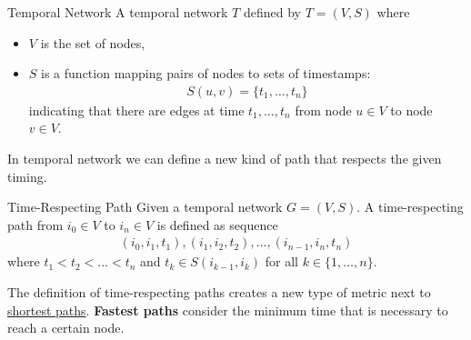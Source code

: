 \documentclass[english]{panikzettel}
\begin{document}
\begin{defi}{Temporal Network}
A temporal network $ T $ defined by $ T = (V,S) $ where
\begin{itemize}
	\item $ V $ is the set of nodes,
	\item $ S $ is a function mapping pairs of nodes to sets of timestamps:
\begin{align*}
	S(u,v) = \{t_1, \dots, t_n\}
\end{align*}
indicating that there are edges at time $ t_1, \dots, t_n $ from node $ u \in V $ to node $ v \in V $.
\end{itemize}
\end{defi}

In temporal network we can define a new kind of path that respects the given timing.

\begin{defi}{Time-Respecting Path}
Given a temporal network $ G = (V,S) $.
A time-respecting path from $ i_0 \in V $ to $ i_n \in V $ is defined as sequence
\begin{align*}
	(i_0,i_1,t_1), (i_1,i_2,t_2), \dots, (i_{n-1}, i_n,t_n)
\end{align*}
where $ t_1 < t_2 < \dots < t_n $ and $ t_k \in S(i_{k-1},i_k) $ for all $ k \in \{1, \dots, n\} $.
\end{defi}

The definition of time-respecting paths creates a new type of metric next to \hyperref[sec:distance]{shortest paths}. 
\textbf{Fastest paths} consider the minimum time that is necessary to reach a certain node.
\end{document}
